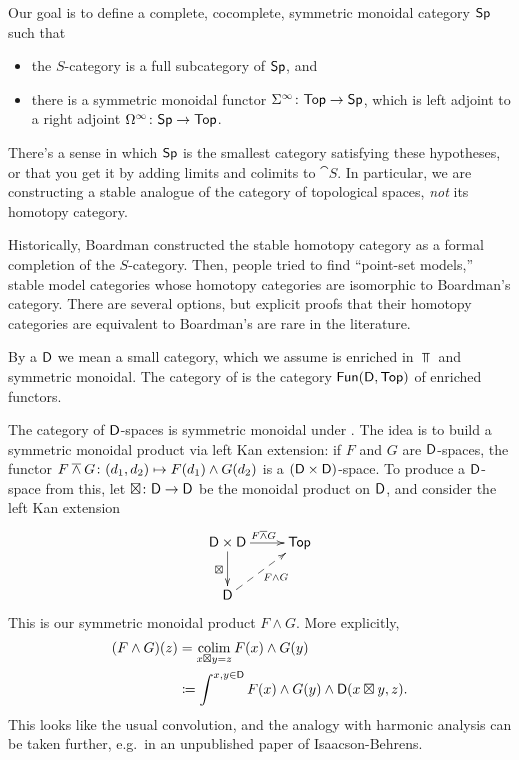 Our goal is to define a complete, cocomplete, symmetric monoidal category $\mathsf{Sp}$ such that
\begin{itemize}
	\item the $S$-category is a full subcategory of $\mathsf{Sp}$, and
	\item there is a symmetric monoidal functor $\Sigma^\infty\colon\mathsf{Top}\to\mathsf{Sp}$, which is left adjoint to a right
	adjoint $\Omega^\infty\colon\mathsf{Sp}\to\mathsf{Top}$.
\end{itemize}
There's a sense in which $\mathsf{Sp}$ is the smallest category satisfying these hypotheses, or that you get it by adding
limits and colimits to $\cat S$. In particular, we are constructing a stable analogue of the category of
topological spaces, \emph{not} its homotopy category.
\begin{rem}
Historically, Boardman constructed the stable homotopy category as a formal completion of the $S$-category. Then,
people tried to find ``point-set models,'' stable model categories whose homotopy categories are isomorphic to
Boardman's category. There are several options, but explicit proofs that their homotopy categories are equivalent to
Boardman's are rare in the literature.
\end{rem}
\begin{defn}
By a  $\mathsf D$ we mean a small category, which we assume is enriched in $\Top$ and symmetric monoidal.
The category of  is the category $\mathsf{Fun}(\mathsf D,\mathsf{Top})$ of enriched functors.
\end{defn}
The category of $\mathsf D$-spaces is symmetric monoidal under . The idea is to build a symmetric
monoidal product via left Kan extension: if $F$ and $G$ are $\mathsf D$-spaces, the functor $F\overwedge
G\colon(d_1,d_2)\mapsto F(d_1)\wedge G(d_2)$ is a $(\mathsf D\times\mathsf D)$-space. To produce a $\mathsf D$-space from this, let
$\boxtimes\colon\mathsf D\to\mathsf D$ be the monoidal product on $\mathsf D$, and consider the left Kan extension
\[\xymatrix{
	\fD\times\fD\ar[r]^{F\overwedge G}\ar[d]_\boxtimes & \Top\\
	\fD\ar@{-->}[ur]_{F\wedge G}
}\]
This is our symmetric monoidal product $F\wedge G$. More explicitly,
\begin{align*}
( F\wedge G)(z) &= \operatorname*{colim}_{x\boxtimes y = z} F(x)\wedge G(y)\\
								&\coloneqq \int^{x, y\in \mathsf D} F(x) \wedge G(y) \wedge \mathsf D(x\boxtimes y, z).
\end{align*}
This looks like the usual convolution, and the analogy with harmonic analysis can be taken further, e.g.\ in an
unpublished paper of Isaacson-Behrens.


